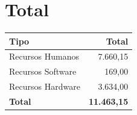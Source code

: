 \section{Total}

\begin{center}
	\begin{tabular}{| l | r |}
		\hline
		Tipo				&	Total			\\	\hline
		Recursos Humanos	& 	7.660,15		\\	\hline
		Recursos Software	&	169,00			\\	\hline
		Recursos Hardware	&	3.634,00		\\	\hline
		\textbf{Total}		&	\textbf{11.463,15}	\\
		\hline
	\end{tabular}
\end{center}